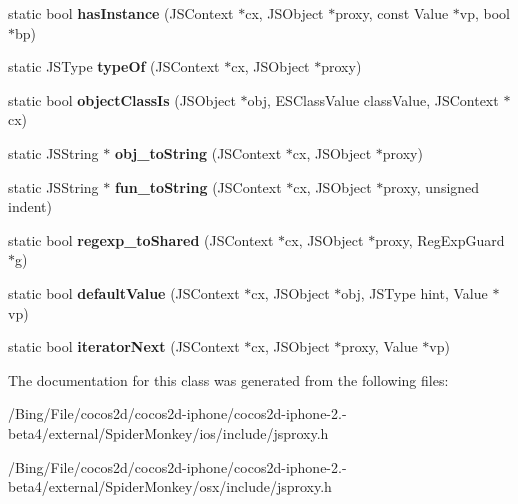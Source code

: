 \begin{DoxyCompactItemize}
\item 
\hypertarget{classjs_1_1_proxy_a87e3f193e8d023f4f994251fa391ca3e}{static bool {\bfseries has\-Instance} (J\-S\-Context $\ast$cx, J\-S\-Object $\ast$proxy, const Value $\ast$vp, bool $\ast$bp)}\label{classjs_1_1_proxy_a87e3f193e8d023f4f994251fa391ca3e}

\item 
\hypertarget{classjs_1_1_proxy_a3cc8aba5ad1d56904cf35ea080c6da4a}{static J\-S\-Type {\bfseries type\-Of} (J\-S\-Context $\ast$cx, J\-S\-Object $\ast$proxy)}\label{classjs_1_1_proxy_a3cc8aba5ad1d56904cf35ea080c6da4a}

\item 
\hypertarget{classjs_1_1_proxy_af92d9a02c9af149b6ad03a3d3b62d6b1}{static bool {\bfseries object\-Class\-Is} (J\-S\-Object $\ast$obj, E\-S\-Class\-Value class\-Value, J\-S\-Context $\ast$cx)}\label{classjs_1_1_proxy_af92d9a02c9af149b6ad03a3d3b62d6b1}

\item 
\hypertarget{classjs_1_1_proxy_ac49074324d9fbfb601125b8f7173351c}{static J\-S\-String $\ast$ {\bfseries obj\-\_\-to\-String} (J\-S\-Context $\ast$cx, J\-S\-Object $\ast$proxy)}\label{classjs_1_1_proxy_ac49074324d9fbfb601125b8f7173351c}

\item 
\hypertarget{classjs_1_1_proxy_a3ced4a051310fb50483388cb55c84591}{static J\-S\-String $\ast$ {\bfseries fun\-\_\-to\-String} (J\-S\-Context $\ast$cx, J\-S\-Object $\ast$proxy, unsigned indent)}\label{classjs_1_1_proxy_a3ced4a051310fb50483388cb55c84591}

\item 
\hypertarget{classjs_1_1_proxy_a9bcc8b353be22db95c1b7866a2d619f1}{static bool {\bfseries regexp\-\_\-to\-Shared} (J\-S\-Context $\ast$cx, J\-S\-Object $\ast$proxy, Reg\-Exp\-Guard $\ast$g)}\label{classjs_1_1_proxy_a9bcc8b353be22db95c1b7866a2d619f1}

\item 
\hypertarget{classjs_1_1_proxy_aa3f353388fd32348e9b462c2defdfe12}{static bool {\bfseries default\-Value} (J\-S\-Context $\ast$cx, J\-S\-Object $\ast$obj, J\-S\-Type hint, Value $\ast$vp)}\label{classjs_1_1_proxy_aa3f353388fd32348e9b462c2defdfe12}

\item 
\hypertarget{classjs_1_1_proxy_a336025d671285655c72e51a1f2aea4da}{static bool {\bfseries iterator\-Next} (J\-S\-Context $\ast$cx, J\-S\-Object $\ast$proxy, Value $\ast$vp)}\label{classjs_1_1_proxy_a336025d671285655c72e51a1f2aea4da}

\end{DoxyCompactItemize}


The documentation for this class was generated from the following files\-:\begin{DoxyCompactItemize}
\item 
/\-Bing/\-File/cocos2d/cocos2d-\/iphone/cocos2d-\/iphone-\/2.-\/beta4/external/\-Spider\-Monkey/ios/include/jsproxy.\-h\item 
/\-Bing/\-File/cocos2d/cocos2d-\/iphone/cocos2d-\/iphone-\/2.-\/beta4/external/\-Spider\-Monkey/osx/include/jsproxy.\-h\end{DoxyCompactItemize}
